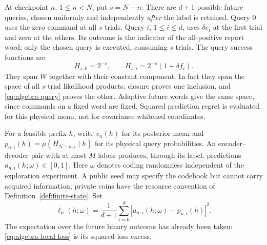 At checkpoint $n$, $1\le n<N$, put $s=N-n$. There are $d+1$ possible
future queries, chosen uniformly and independently \emph{after} the
label is retained. Query $0$ uses the zero command at all $s$ trials.
Query $i$, $1\le i\le d$, uses $\delta e_i$ at the first trial and
zero at the others. Its outcome is the indicator of the all-positive
report word; only the chosen query is executed, consuming $s$ trials.
The query success functions are
\begin{equation}\label{eq:algebra-query}
 H_{s,0}=2^{-s},\qquad H_{s,i}=2^{-s}(1+\delta f_i).
\end{equation}
They span $W$ together with their constant component. In fact they span
the space of all $s$-trial likelihood products: closure proves one
inclusion, and \eqref{eq:algebra-query} proves the other. Adaptive
future words give the same space, since commands on a fixed word are
fixed. Squared prediction regret is evaluated for this physical menu,
not for covariance-whitened coordinates.

For a feasible prefix $h$, write $v_n(h)$ for its posterior mean and
$p_{n,i}(h)=\mu(H_{N-n,i}\mid h)$ for its physical query probabilities.
An encoder--decoder pair with at most $M$ labels produces, through its
label, predictions $a_{n,i}(h;\omega)\in[0,1]$. Here $\omega$ denotes
coding randomness independent of the exploration experiment. A public
seed may specify the codebook but cannot carry acquired information;
private coins have the resource convention of
Definition~\ref{def:finite-state}. Set
\begin{equation}\label{eq:algebra-local-loss}
 \ell_n(h;\omega)=\frac1{d+1}\sum_{i=0}^d
                  |a_{n,i}(h;\omega)-p_{n,i}(h)|^2.
\end{equation}
The expectation over the future binary outcome has already been taken:
\eqref{eq:algebra-local-loss} is its squared-loss excess.


